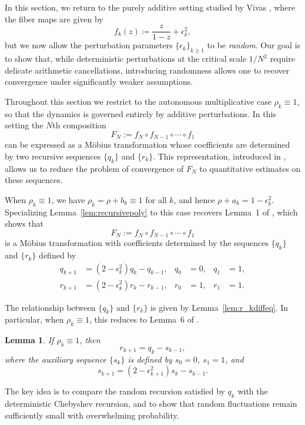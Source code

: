 \documentclass{amsart}
\newtheorem{lemma}{Lemma}
\theoremstyle{remark}
\theoremstyle{definition}
\begin{document}
In this section, we return to the purely additive setting studied by Vivas \cite{Viv20}, where the fiber maps are given by
\[
   f_k(z) \coloneqq \frac{z}{1-z} + \epsilon_k^2,
\]
but we now allow the perturbation parameters $\{\epsilon_k\}_{k\geq 1}$ to be \emph{random}.  
Our goal is to show that, while deterministic perturbations at the critical scale $1/N^2$ require delicate arithmetic cancellations, introducing randomness allows one to recover convergence under significantly weaker assumptions.

Throughout this section we restrict to the autonomous multiplicative case $\rho_k\equiv 1$, so that the dynamics is governed entirely by additive perturbations.  
In this setting the $N$th composition
\[
   F_N := f_N \circ f_{N-1} \circ \cdots \circ f_1
\]
can be expressed as a M\"obius transformation whose coefficients are determined by two recursive sequences $\{q_k\}$ and $\{r_k\}$.  
This representation, introduced in \cite{Viv20}, allows us to reduce the problem of convergence of $F_N$ to quantitative estimates on these sequences.

When $\rho_{k}\equiv 1$, we have $\rho_k=\rho+b_k\equiv 1$ for all $k$, and hence
$\rho+a_k = 1-\epsilon_k^2$.  
Specializing Lemma~\ref{lem:recursivepoly} to this case recovers Lemma~1 of \cite{Viv20}, which shows that
\[
   F_N := f_N \circ f_{N-1} \circ \cdots \circ f_1
\]
is a M\"obius transformation with coefficients determined by the sequences $\{q_k\}$ and $\{r_k\}$ defined by
\begin{align*}
q_{k+1} &= (2-\epsilon_{k}^{2}) q_k-q_{k-1}, & q_0&=0, & q_1&=1, \\
r_{k+1} &= (2-\epsilon_{k}^{2}) r_k-r_{k-1}, & r_0&=1, & r_1&=1.  
\end{align*}

The relationship between $\{q_k\}$ and $\{r_k\}$ is given by Lemma~\ref{lem:r_kdiffeq}.  
In particular, when $\rho_k\equiv 1$, this reduces to Lemma~6 of \cite{Viv20}.

\begin{lemma}\label{lemma:skEpsilon}
If $\rho_k\equiv 1$, then
\[
   r_{k+1} = q_k - s_{k-1},
\]
where the auxiliary sequence $\{s_k\}$ is defined by $s_0=0$, $s_1=1$, and
\[
   s_{k+1}=(2-\epsilon_{k+1}^2)s_k-s_{k-1}.
\]
\end{lemma}

The key idea is to compare the random recursion satisfied by $q_k$ with the deterministic Chebyshev recursion, and to show that random fluctuations remain sufficiently small with overwhelming probability.
\end{document}
